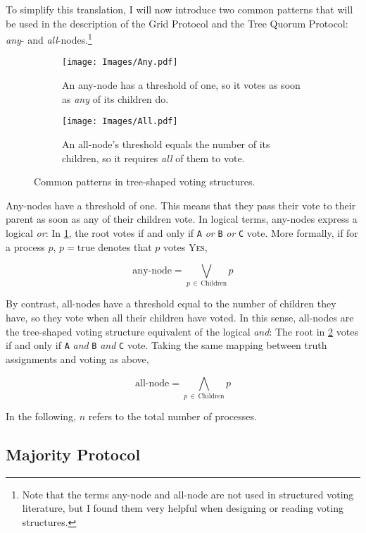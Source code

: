 \documentclass[12pt,chapterprefix=true,toc=bibliography,numbers=noendperiod,
               footnotes=multiple,twoside]{scrreprt}
\newcommand{\yes}{{\fontfamily{jkposn}\selectfont\textsc{Yes}}}
\begin{document}
To simplify this translation, I will now introduce two common patterns that will be used in the description of the Grid Protocol and the Tree Quorum Protocol: \emph{any}- and \emph{all}-nodes.\footnote{Note that the terms any-node and all-node are not used in structured voting literature, but I found them very helpful when designing or reading voting structures.}

\begin{figure}[h]
    \centering
    \begin{subfigure}[t]{0.41\textwidth}
        \centering
        \texttt{[image: Images/Any.pdf]}
        \caption{An any-node has a threshold of one, so it votes as soon as \emph{any} of its children do.}
        \label{fig:any}
    \end{subfigure}
    \quad
    \begin{subfigure}[t]{0.41\textwidth}
        \centering
        \texttt{[image: Images/All.pdf]}
        \caption{An all-node's threshold equals the number of its children, so it requires \emph{all} of them to vote.}
        \label{fig:all}
    \end{subfigure}
    \caption{Common patterns in tree-shaped voting structures.}
    \label{fig:tsvs-patterns}
\end{figure}

Any-nodes have a threshold of one. This means that they pass their vote to their parent as soon as any of their children vote. In logical terms, any-nodes express a logical \emph{or}: In \cref{fig:any}, the root votes if and only if \texttt{A} \emph{or} \texttt{B} \emph{or} \texttt{C} vote. More formally, if for a process \(p\), \(p = \text{true}\) denotes that \(p\) votes \yes,

\[ \text{any-node} = \bigvee_{p\,\in\,\text{Children}} p \]

By contrast, all-nodes have a threshold equal to the number of children they have, so they vote when all their children have voted. In this sense, all-nodes are the tree-shaped voting structure equivalent of the logical \emph{and}: The root in \cref{fig:all} votes if and only if \texttt{A} \emph{and} \texttt{B} \emph{and} \texttt{C} vote. Taking the same mapping between truth assignments and voting as above,

\[ \text{all-node} = \bigwedge_{p\,\in\,\text{Children}} p \]

In the following, \(n\) refers to the total number of processes.

\subsection{Majority Protocol}
\label{ssc:majority}
\end{document}
